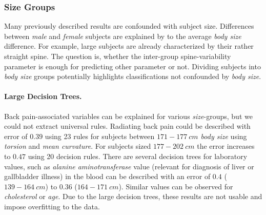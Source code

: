 \documentclass[a4paper,twoside]{style/article}
\newcommand{\com}[1]{\textcolor{orange}{\uline{#1}}}
\begin{document}
%
%

\subsubsection{Size Groups}
Many previously described results are confounded with subject size.
Differences between \emph{male} and \emph{female} subjects are explained by to the average \emph{body size} difference.
For example, large subjects are already characterized by their rather straight spine.
%
The question is, whether the inter-group spine-variability parameter is enough for predicting other parameter or not.
Dividing subjects into \emph{body size} groups potentially highlights classifications not confounded by \emph{body size}.
\paragraph{Large Decision Trees. }
Back pain-associated variables can be explained for various \emph{size}-groups, but we could not extract universal rules.
Radiating back pain could be described with error of $0.39$ using 23 rules for subjects between \emph{$171-177~cm$ body size} using \emph{torsion} and \emph{mean curvature}.
For subjects sized \emph{$177-202~cm$} the error increases to $0.47$ using 20 decision rules.
There are several decision trees for laboratory values, such as \emph{alanine aminotransferase} value (relevant for diagnosis of liver or gallbladder illness) in the blood can be described with an error of $0.4$ (\emph{$139-164~cm$}) to $0.36$ (\emph{$164 - 171~cm$}).
Similar values can be observed for \emph{cholesterol} or \emph{age}.
Due to the large decision trees, these results are not usable and impose overfitting to the data.
\end{document}
